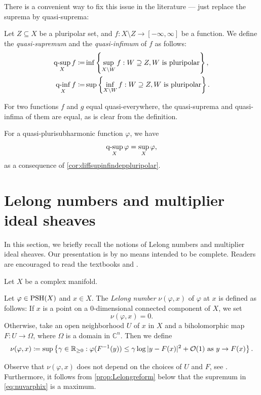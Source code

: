 There is a convenient way to fix this issue in the literature --- just replace the suprema by quasi-suprema:
\begin{definition}\label{def:quasi_sup}
    Let $Z\subseteq X$ be a pluripolar set, and $f\colon X\setminus Z\rightarrow [-\infty,\infty]$ be a function. We define the \emph{quasi-supremum} and the \emph{quasi-infimum} of $f$ as follows:
    \[
    \begin{split}
    \operatorname*{q-sup}_X f\coloneqq &\inf\left\{\sup_{X\setminus W} f:W\supseteq Z, W \textup{ is pluripolar}\right\},\\
    \operatorname*{q-inf}_X f\coloneqq &\sup\left\{\inf_{X\setminus W} f:W\supseteq Z, W \textup{ is pluripolar}\right\}.
    \end{split}
    \]
\end{definition}
For two functions $f$ and $g$ equal quasi-everywhere, the quasi-suprema and quasi-infima of them are equal, as is clear from the definition.

For a quasi-plurisubharmonic function $\varphi$, we have
\[
\operatorname*{q-sup}_X \varphi=\sup_X \varphi,
\]
as a consequence of \cref{cor:diffsupinfindeppluripolar}.

\section{Lelong numbers and multiplier ideal sheaves}\label{sec:Lelongmis}
In this section, we briefly recall the notions of Lelong numbers and multiplier ideal sheaves. Our presentation is by no means intended to be complete. Readers are encouraged to read the textbooks \cite[Section~2.3]{GZ17} and \cite{Dem12}.

Let $X$ be a complex manifold.

\begin{definition}\label{def:pshfunctions:L1002}
    Let $\varphi\in \mathrm{PSH}(X)$ and $x\in X$. The \emph{Lelong number} $\nu(\varphi,x)$ of $\varphi$ at $x$ is defined as follows:
    If $x$ is a point on a $0$-dimensional connected component of $X$, we set
    \[
        \nu(\varphi,x)=0.
    \]
    Otherwise, take an open neighborhood $U$ of $x$ in $X$ and a biholomorphic map $F\colon U\rightarrow \Omega$, where $\Omega$ is a domain in $\mathbb{C}^n$. Then we define
    \begin{equation}\label{eq:nuvarphix}
    \nu(\varphi,x)\coloneqq \sup\left\{ \gamma\in \mathbb{R}_{\geq 0}: \varphi(F^{-1}(y))\leq \gamma \log|y-F(x)|^2+\mathcal{O}(1)\textup{ as }y\to F(x) \right\}.
    \end{equation}
\end{definition}
Observe that $\nu(\varphi,x)$ does not depend on the choices of $U$ and $F$, see \cite[Page~167, Corollary~7.2]{DemBook}.
Furthermore, it follows from \cref{prop:Lelongreform} below that the supremum in \eqref{eq:nuvarphix} is a maximum.

